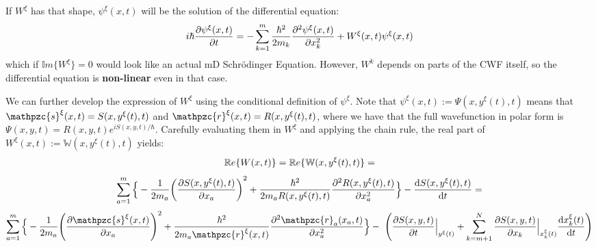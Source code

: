 \documentclass[11pt, a4paper]{article} %
\newcommand{\R}{\mathbb{R}} %
\newcommand{\z}{\mathpzc{s}}
\newcommand{\p}{\mathpzc{r}}
\newcommand{\W}{\mathbb{W}}
\begin{document}
If $W^\xi$ has that shape, $\psi^\xi (x,t)$ will be the solution of the differential equation:\vspace{-0.2cm}
$$
i \hbar \pdv{\psi^\xi (x,t)}{t} = -\sum_{k=1}^m \frac{\hbar^2}{2 m_k}\pdv[2]{\psi^\xi (x,t)}{x_k} + W^\xi(x,t) \psi^\xi (x,t)\vspace{-0.2cm}
$$
which if $\mathbb{I}m\{W^\xi\} =0$ would look like an actual mD Schrödinger Equation. However, $W^k$ depends on parts of the CWF itself, so the differential equation is  {\bf non-linear} even in that case.

We can further develop the expression of $W^\xi$ using the conditional definition of $\psi^\xi$. Note that $\psi^\xi ( x, t) := \Psi(x, y^\xi(t),t)$ means that $\z^\xi(x,t)=S(x, y^\xi(t),t)$ and $\p^\xi (x,t)=R(x, y^\xi(t),t)$, where we have that the full wavefunction in polar form is $\Psi(x,y,t)=R(x,y,t)e^{iS(x,y,t)/\hbar}$. Carefully evaluating them in $W^\xi$ and applying the chain rule, the real part of $W^\xi(x,t):=\W(x,y^\xi(t),t)$ yields:
$$
\R e\{W(x,t)\}=\R e\{\W(x, y^\xi(t),t)\}=\vspace{-0.12cm}
$$
$$
\sum_{a=1}^m \Big\{-\frac{1}{2m_a} \qty(\pdv{S(x, y^\xi(t),t)}{x_a})^2 +\frac{\hbar^2}{2m_aR(x,y^\xi(t),t)}\pdv[2]{R(x, y^\xi(t),t)}{x_a}\Big\}-\dv{S(x,y^\xi(t),t)}{t}=\vspace{-0.1cm}
$$
$$
\sum_{a=1}^m\Big\{-\frac{1}{2m_a} \qty(\pdv{\z^\xi(x,t)}{x_a})^2 +\frac{\hbar^2}{2m_a\p^\xi(x,t)}\pdv[2]{\p_a(x_a, t)}{x_a}\Big\}- \ \qty(\pdv{S(x,y,t)}{t}\Big\rvert_{y^\xi(t)}+\sum_{k=m+1}^N \pdv{S(x,y,t)}{x_k}\Big\rvert_{x_k^\xi(t)} \dv{x_k^\xi(t)}{t})\vspace{-0.12cm}
$$
\end{document}
